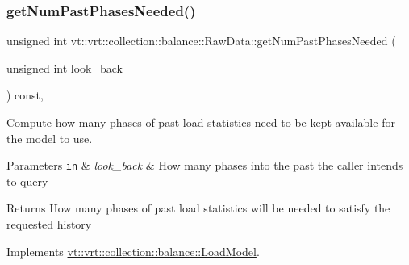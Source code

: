 \mbox{\label{structvt_1_1vrt_1_1collection_1_1balance_1_1_raw_data_ad81a96c22f81405e93bf162e6aafbeed}} 
\subsubsection{\texorpdfstring{get\+Num\+Past\+Phases\+Needed()}{getNumPastPhasesNeeded()}}
{\footnotesize\ttfamily unsigned int vt\+::vrt\+::collection\+::balance\+::\+Raw\+Data\+::get\+Num\+Past\+Phases\+Needed (\begin{DoxyParamCaption}\item[{unsigned int}]{look\+\_\+back }\end{DoxyParamCaption}) const\hspace{0.3cm}{\ttfamily [override]}, {\ttfamily [virtual]}}



Compute how many phases of past load statistics need to be kept available for the model to use. 


\begin{DoxyParams}[1]{Parameters}
\mbox{\tt in}  & {\em look\+\_\+back} & How many phases into the past the caller intends to query\\
\hline
\end{DoxyParams}
\begin{DoxyReturn}{Returns}
How many phases of past load statistics will be needed to satisfy the requested history 
\end{DoxyReturn}


Implements \hyperlink{structvt_1_1vrt_1_1collection_1_1balance_1_1_load_model_a44905eb3e15e7f22b2f8d1fe7297cea0}{vt\+::vrt\+::collection\+::balance\+::\+Load\+Model}.

\mbox{\label{structvt_1_1vrt_1_1collection_1_1balance_1_1_raw_data_a252d51c7265f225736068a4ae87b4a0a}} 
